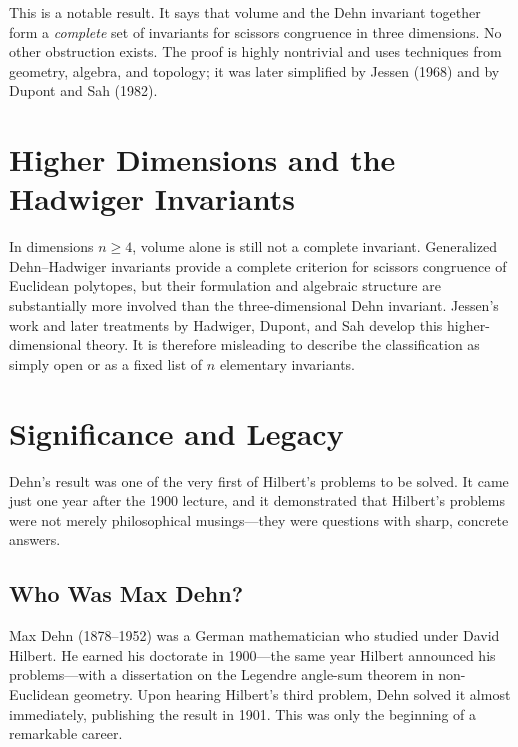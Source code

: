 This is a notable result. It says that volume and the Dehn invariant together form a \emph{complete} set of invariants for scissors congruence in three dimensions. No other obstruction exists. The proof is highly nontrivial and uses techniques from geometry, algebra, and topology; it was later simplified by Jessen (1968) and by Dupont and Sah (1982).

\section{Higher Dimensions and the Hadwiger Invariants}

In dimensions $n \geq 4$, volume alone is still not a complete invariant. Generalized Dehn--Hadwiger invariants provide a complete criterion for scissors congruence of Euclidean polytopes, but their formulation and algebraic structure are substantially more involved than the three-dimensional Dehn invariant. Jessen's work and later treatments by Hadwiger, Dupont, and Sah develop this higher-dimensional theory. It is therefore misleading to describe the classification as simply open or as a fixed list of $n$ elementary invariants.

\section{Significance and Legacy}

Dehn's result was one of the very first of Hilbert's problems to be solved. It came just one year after the 1900 lecture, and it demonstrated that Hilbert's problems were not merely philosophical musings---they were questions with sharp, concrete answers.

\subsection{Who Was Max Dehn?}

Max Dehn (1878--1952) was a German mathematician who studied under David Hilbert. He earned his doctorate in 1900---the same year Hilbert announced his problems---with a dissertation on the Legendre angle-sum theorem in non-Euclidean geometry. Upon hearing Hilbert's third problem, Dehn solved it almost immediately, publishing the result in 1901. This was only the beginning of a remarkable career.

